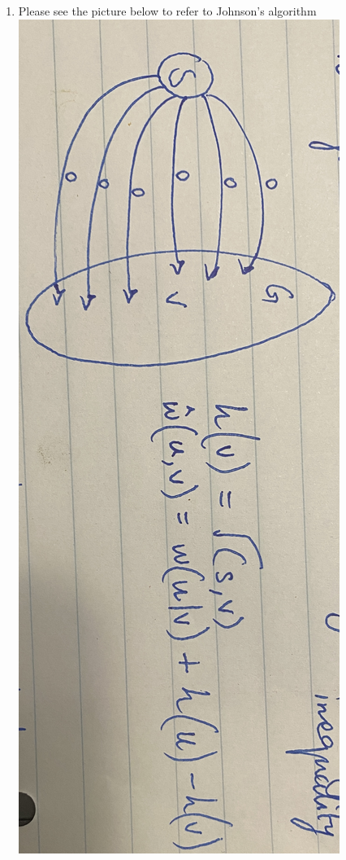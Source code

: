 \documentclass[11pt]{article}
\begin{document}
\begin{enumerate}
\begin{enumerate}
\begin{enumerate}
        \item Please see the picture below to refer to Johnson's algorithm\\ \includegraphics[scale=0.1, angle=90]{IMG_8537.JPG}
    \end{enumerate}

\end{enumerate}
\end{enumerate}
\end{document}

